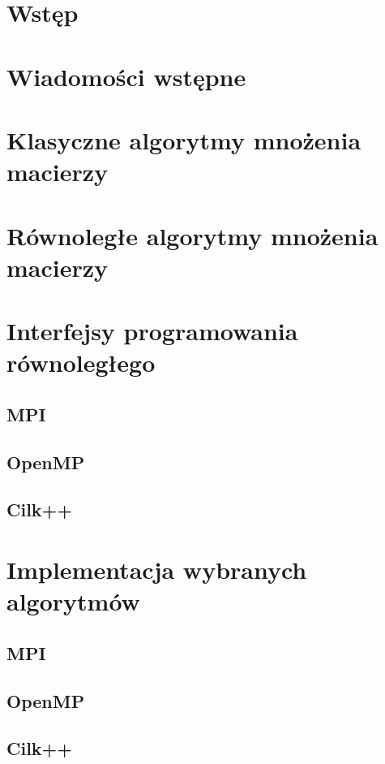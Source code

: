\documentclass[a4paper,oneside,leqno,12pt]{book}
\begin{document}

\tableofcontents

\chapter{Wstęp}

\chapter{Wiadomości wstępne}

\chapter{Klasyczne algorytmy mnożenia macierzy}

\chapter{Równoległe algorytmy mnożenia macierzy}


\chapter{Interfejsy programowania równoległego}
\section{MPI}
\section{OpenMP}
\section{Cilk++}

\chapter{Implementacja wybranych algorytmów}
\section{MPI}
\section{OpenMP}
\section{Cilk++}



\end{document}
